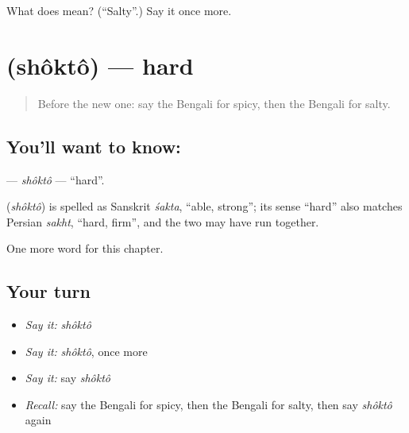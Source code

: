 \begin{tcolorbox}[breakable,colback=teal!4,colframe=teal!35!black,title={Before you move on}]
What does  mean? (\textquotedblleft{}Salty\textquotedblright{}.) Say it once more.
\end{tcolorbox}
\section[\texorpdfstring{\bn{শক্ত} (shôktô)}{শক্ত (shôktô)}]{ (shôktô) — hard}

\label{lesson:BN-C134-shokto}



\begin{quote}
Before the new one: say the Bengali for spicy, then the Bengali for salty.
\end{quote}

\subsection*{You'll want to know: }
\textbf{} — \emph{shôktô} — \textquotedblleft{}hard\textquotedblright{}.

\begin{cousinweb}
\textbf{} (\emph{shôktô}) is spelled as Sanskrit \emph{śakta}, \textquotedblleft{}able, strong\textquotedblright{}; its sense \textquotedblleft{}hard\textquotedblright{} also matches Persian \emph{sakht}, \textquotedblleft{}hard, firm\textquotedblright{}, and the two may have run together.
\end{cousinweb}

\begin{grammarlens}[title={What you've built}]
One more word for this chapter.
\end{grammarlens}

\subsection*{Your turn}
\begin{itemize}
\raggedright
  \item \emph{Say it:} \emph{shôktô}
  \item \emph{Say it:} \emph{shôktô}, once more
  \item \emph{Say it:} say \emph{shôktô}
  \item \emph{Recall:} say the Bengali for spicy, then the Bengali for salty, then say \emph{shôktô} again
\end{itemize}

